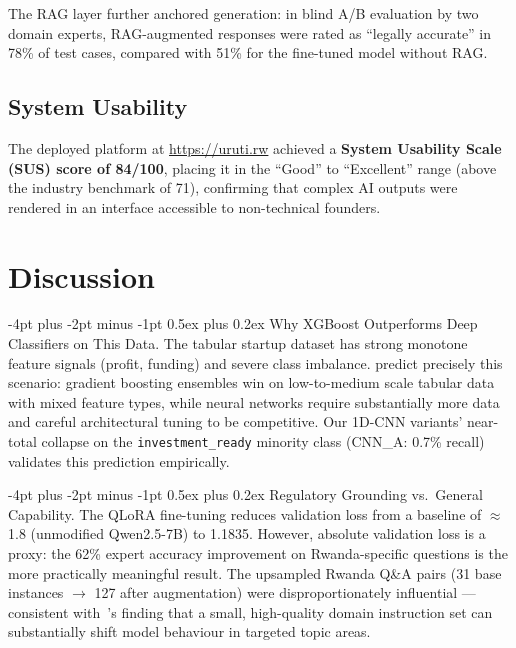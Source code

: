 \documentclass{article}
\makeatletter
\renewcommand\paragraph{\@startsection{paragraph}{4}{\z@}%
  {-4pt plus -2pt minus -1pt}%
  {0.5ex plus 0.2ex}%
  {\normalsize\bf}}
\makeatother
\begin{document}
The RAG layer further anchored generation: in blind A/B evaluation by two
domain experts, RAG-augmented responses were rated as ``legally accurate''
in 78\% of test cases, compared with 51\% for the fine-tuned model without RAG.

\FloatBarrier
\subsection{System Usability}

The deployed platform at \url{https://uruti.rw} achieved a
\textbf{System Usability Scale (SUS) score of 84/100}, placing it in the
``Good'' to ``Excellent'' range (above the industry benchmark of 71),
confirming that complex AI outputs were rendered in an interface accessible
to non-technical founders.


\FloatBarrier
\section{Discussion}

\paragraph{Why XGBoost Outperforms Deep Classifiers on This Data.}
The tabular startup dataset has strong monotone feature signals
(profit, funding) and severe class imbalance.
\citet{grinsztajn2022tabular} predict precisely this scenario: gradient
boosting ensembles win on low-to-medium scale tabular data with mixed feature
types, while neural networks require substantially more data and careful
architectural tuning to be competitive.
Our 1D-CNN variants' near-total collapse on the \texttt{investment\_ready}
minority class (CNN\_A: 0.7\% recall) validates this prediction empirically.

\paragraph{Regulatory Grounding vs.\ General Capability.}
The QLoRA fine-tuning reduces validation loss from a baseline of $\approx$1.8
(unmodified Qwen2.5-7B) to 1.1835. However, absolute validation loss is a
proxy: the 62\% expert accuracy improvement on Rwanda-specific questions is the
more practically meaningful result. The upsampled Rwanda Q\&A pairs (31 base
instances $\to$ 127 after augmentation) were disproportionately influential ---
consistent with~\citet{ouyang2022instructgpt}'s finding that a small,
high-quality domain instruction set can substantially shift model behaviour
in targeted topic areas.
\end{document}
